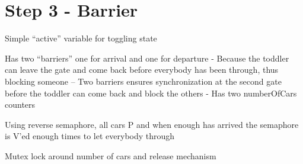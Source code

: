 \section*{Step 3 - Barrier}

Simple ``active'' variable for toggling state

Has two ``barriers'' one for arrival and one for departure
- Because the toddler can leave the gate and come back before everybody has been through, thus blocking someone
-- Two barriers ensures synchronization at the second gate before the toddler can come back and block the others
- Has two numberOfCars counters

Using reverse semaphore, all cars P and when enough has arrived the semaphore is V'ed enough times to let everybody through

Mutex lock around number of cars and release mechanism




